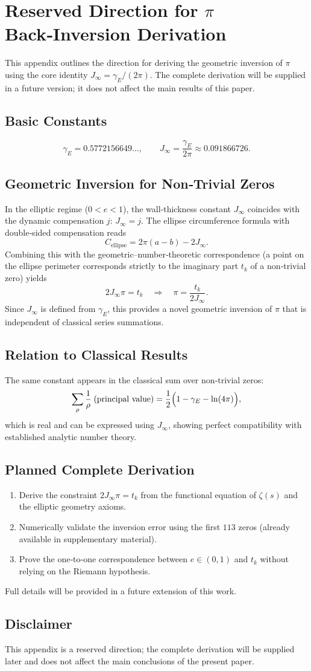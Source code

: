 \documentclass[12pt,a4paper]{article}
\begin{document}
\section{Reserved Direction for $\pi$ Back‑Inversion Derivation}\label{app:B}

\footnotesize

This appendix outlines the direction for deriving the geometric inversion of $\pi$ using the core identity $J_\infty = \gamma_E/(2\pi)$. The complete derivation will be supplied in a future version; it does not affect the main results of this paper.

\subsection{Basic Constants}
\[
\gamma_E = 0.5772156649\ldots,\qquad J_\infty = \frac{\gamma_E}{2\pi}\approx0.091866726.
\]

\subsection{Geometric Inversion for Non‑Trivial Zeros}
In the elliptic regime ($0<e<1$), the wall‑thickness constant $J_\infty$ coincides with the dynamic compensation $j$: $J_\infty = j$. The ellipse circumference formula with double‑sided compensation reads
\[
C_{\text{ellipse}} = 2\pi(a-b) - 2J_\infty.
\]
Combining this with the geometric–number‑theoretic correspondence (a point on the ellipse perimeter corresponds strictly to the imaginary part $t_k$ of a non‑trivial zero) yields
\[
2J_\infty\pi = t_k \quad\Longrightarrow\quad \pi = \frac{t_k}{2J_\infty}.
\]
Since $J_\infty$ is defined from $\gamma_E$, this provides a novel geometric inversion of $\pi$ that is independent of classical series summations.

\subsection{Relation to Classical Results}
The same constant appears in the classical sum over non‑trivial zeros:
\[
\sum_{\rho}\frac{1}{\rho}\;(\text{principal value}) = \frac12\Bigl(1-\gamma_E-\ln(4\pi)\Bigr),
\]
which is real and can be expressed using $J_\infty$, showing perfect compatibility with established analytic number theory.

\subsection{Planned Complete Derivation}
\begin{enumerate}
\item Derive the constraint $2J_\infty\pi = t_k$ from the functional equation of $\zeta(s)$ and the elliptic geometry axioms.
\item Numerically validate the inversion error using the first $113$ zeros (already available in supplementary material).
\item Prove the one‑to‑one correspondence between $e\in(0,1)$ and $t_k$ without relying on the Riemann hypothesis.
\end{enumerate}
Full details will be provided in a future extension of this work.

\subsection{Disclaimer}
This appendix is a reserved direction; the complete derivation will be supplied later and does not affect the main conclusions of the present paper.

\normalsize
\end{document}
